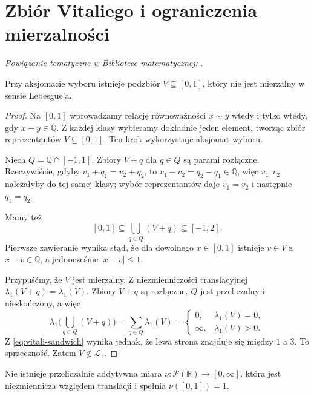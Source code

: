 \section{Zbiór Vitaliego i ograniczenia mierzalności}

\noindent\emph{Powiązanie tematyczne w Bibliotece matematycznej:} .


\begin{twierdzenie}
\label{thm:vitali}
Przy aksjomacie wyboru istnieje podzbiór
$V\subseteq[0,1]$, który nie jest mierzalny
w sensie Lebesgue'a.
\end{twierdzenie}

\begin{proof}
Na $[0,1]$ wprowadzamy relację równoważności
$x\sim y$ wtedy i tylko wtedy, gdy $x-y\in\mathbb Q$.
Z każdej klasy wybieramy dokładnie jeden element,
tworząc zbiór reprezentantów $V\subseteq[0,1]$.
Ten krok wykorzystuje aksjomat wyboru.

Niech $Q=\mathbb Q\cap[-1,1]$. Zbiory $V+q$ dla
$q\in Q$ są parami rozłączne. Rzeczywiście, gdyby
$v_1+q_1=v_2+q_2$, to
$v_1-v_2=q_2-q_1\in\mathbb Q$, więc $v_1,v_2$
należałyby do tej samej klasy; wybór reprezentantów
daje $v_1=v_2$ i następnie $q_1=q_2$.

Mamy też
\begin{equation}\label{eq:vitali-sandwich}
[0,1]\subseteq\bigcup_{q\in Q}(V+q)\subseteq[-1,2].
\end{equation}
Pierwsze zawieranie wynika stąd, że dla dowolnego
$x\in[0,1]$ istnieje $v\in V$ z $x-v\in\mathbb Q$,
a jednocześnie $|x-v|\le1$.

Przypuśćmy, że $V$ jest mierzalny. Z niezmienniczości
translacyjnej $\lambda_1(V+q)=\lambda_1(V)$.
Zbiory $V+q$ są rozłączne, $Q$ jest przeliczalny i
nieskończony, a więc
\[
\lambda_1\Big(\bigcup_{q\in Q}(V+q)\Big)
=\sum_{q\in Q}\lambda_1(V)
=\begin{cases}0,&\lambda_1(V)=0,\\
\infty,&\lambda_1(V)>0.
\end{cases}
\]
Z \eqref{eq:vitali-sandwich} wynika jednak, że lewa
strona znajduje się między $1$ a $3$. To sprzeczność.
Zatem $V\notin\mathcal L_1$.
\end{proof}

\begin{wniosek}
\label{cor:no-all-subsets-invariant}
Nie istnieje przeliczalnie addytywna miara
$\nu:\mathcal P(\mathbb R)\to[0,\infty]$, która
jest niezmiennicza względem translacji i spełnia
$\nu([0,1])=1$.
\end{wniosek}

